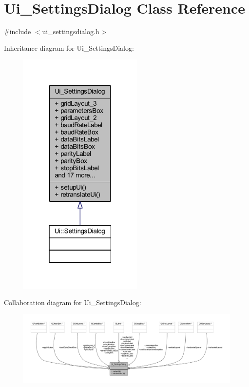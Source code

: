 \hypertarget{a00082}{\section{Ui\+\_\+\+Settings\+Dialog Class Reference}
\label{a00082}
}


{\ttfamily \#include $<$ui\+\_\+settingsdialog.\+h$>$}



Inheritance diagram for Ui\+\_\+\+Settings\+Dialog\+:
\nopagebreak
\begin{figure}[H]
\begin{center}
\leavevmode
\includegraphics[width=175pt]{d4/dbe/a00574}
\end{center}
\end{figure}


Collaboration diagram for Ui\+\_\+\+Settings\+Dialog\+:
\nopagebreak
\begin{figure}[H]
\begin{center}
\leavevmode
\includegraphics[width=350pt]{d9/d42/a00575}
\end{center}
\end{figure}
